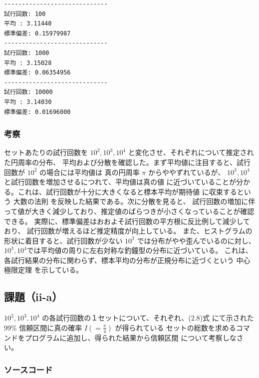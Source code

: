 \documentclass[10pt,a4paper,titlepage]{jreport} %
\begin{document}
\clearpage

\begin{lstlisting}[caption=kadai2i]
-----------------------------
試行回数: 100
平均 : 3.11440
標準偏差: 0.15979987
-----------------------------
試行回数: 1000
平均 : 3.15028
標準偏差: 0.06354956
-----------------------------
試行回数: 10000
平均 : 3.14030
標準偏差: 0.01696000
\end{lstlisting}

\subsubsection{考察}

セットあたりの試行回数を $10^2, 10^3, 10^4$ と変化させ、それぞれについて推定された円周率の分布、
平均および分散を確認した。まず平均値に注目すると、試行回数が $10^2$ の場合には平均値は
真の円周率 $\pi$ からややずれているが、 $10^3, 10^4$ と試行回数を増加させるにつれて、平均値は真の値
に近づいていることが分かる。これは、試行回数が十分に大きくなると標本平均が期待値
に収束するという 大数の法則 を反映した結果である。次に分散を見ると、
試行回数の増加に伴って値が大きく減少しており、推定値のばらつきが小さくなっていることが確認できる。
実際に、標準偏差はおおよそ試行回数の平方根に反比例して減少しており、
試行回数が増えるほど推定精度が向上している。
また、ヒストグラムの形状に着目すると、試行回数が少ない $10^2$ では分布がやや歪んでいるのに対し、
$10^3, 10^4$では平均値の周りに左右対称な釣鐘型の分布に近づいている。
これは、各試行結果の分布に関わらず、標本平均の分布が正規分布に近づくという 中心極限定理 を示している。

\subsection{課題（ii-a）}

$10^2, 10^3, 10^4$ の各試行回数の１セットについて、それぞれ、(2.8)式
にて示された99\% 信頼区間に真の確率 $I(=\frac{\pi}{4})$ が得られている
セットの総数を求めるコマンドをプログラムに追加し、得られた結果から信頼区間
について考察しなさい。

\subsubsection{ソースコード}
\end{document}
